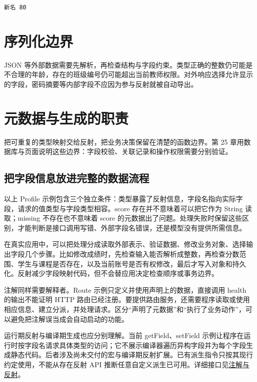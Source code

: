 \par
\medskip
\begin{lstlisting}[style=out]
新名 80
\end{lstlisting}
\par
\medskip

\section{序列化边界}

JSON 等外部数据需要先解析，再检查结构与字段约束。类型正确的整数仍可能是不合理的年龄，存在的班级编号仍可能超出当前教师权限。对外响应选择允许显示的字段，密码摘要等内部字段不应因为参与反射就被自动导出。

\section{元数据与生成的职责}

把可重复的类型映射交给反射，把业务决策保留在清楚的函数边界。第 25 章用数据库与页面说明这些边界：字段校验、关联记录和操作权限需要分别验证。

\subsection*{把字段信息放进完整的数据流程}

以上 Profile 示例包含三个独立条件：类型暴露了反射信息，字段名指向实际字段，请求的值类型与字段类型相容。score 存在并不意味着可以把它作为 String 读取；missing 不存在也不意味着 score 的元数据出了问题。处理失败时保留这些区别，才能判断是接口调用写错、外部字段名错误，还是模型没有提供所需信息。

在真实应用中，可以把处理分成读取外部表示、验证数据、修改业务对象、选择输出字段几个步骤。比如修改成绩时，先检查输入能否解析成整数，再检查分数范围、学生与课程是否存在，以及当前账号是否有权修改，最后才写入对象和持久化。反射减少字段映射代码，但不会替应用决定检查顺序或事务边界。

注解同样需要解释者。Route 示例只定义并使用声明上的数据，直接调用 health 的输出不能证明 HTTP 路由已经注册。要提供路由服务，还需要程序读取或使用相应信息、建立分派，并处理请求。区分“声明了元数据”和“执行了业务动作”，可以避免把注解误当成会自动启动的功能。

运行期反射与编译期生成也应分别理解。当前 getField、setField 示例让程序在运行时按字段名请求具体类型的访问；它不展示编译器遍历异构字段并为每个字段生成静态代码。后者涉及尚未交付的宏与编译期反射扩展。已有派生指令只按其现行约定使用，不能从存在反射 API 推断任意自定义派生已可用。详细接口见\href{https://github.com/rabbitc999/ChaLi/blob/master/doc/19-reflection.md}{注解与反射}。

